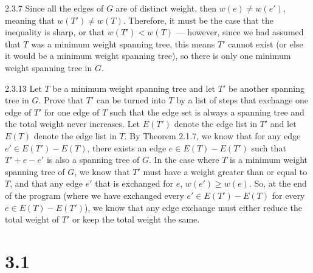 \documentclass[8pt]{extarticle}
\begin{document}
{\begin{problem}{2.3.7}
    Since all the edges of $G$ are of distinct weight, then $w(e) \neq w(e')$, meaning that $w(T') \neq w(T)$. Therefore, it must be the case that the inequality is sharp, or that $w(T') < w(T)$ --- however, since we had assumed that $T$ was a minimum weight spanning tree, this means $T'$ cannot exist (or else it would be a minimum weight spanning tree), so there is only one minimum weight spanning tree in $G$.
  \end{problem}
  \begin{problem}{2.3.13}
    Let $T$ be a minimum weight spanning tree and let $T'$ be another spanning tree in $G$. Prove that $T'$ can be turned into $T$ by a list of steps that exchange one edge of $T'$ for one edge of $T$ such that the edge set is always a spanning tree and the total weight never increases.
    \tcblower
    Let $E(T')$ denote the edge list in $T'$ and let $E(T)$ denote the edge list in $T$. By Theorem 2.1.7, we know that for any edge $e'\in E(T') - E(T)$, there exists an edge $e\in E(T) - E(T')$ such that $T'+ e - e'$ is also a spanning tree of $G$. In the case where $T$ is a minimum weight spanning tree of $G$, we know that $T'$ must have a weight greater than or equal to $T$, and that any edge $e'$ that is exchanged for $e$, $w(e') \geq w(e)$. So, at the end of the program (where we have exchanged every $e'\in E(T') - E(T)$ for every $e\in E(T) - E(T')$), we know that any edge exchange must either reduce the total weight of $T'$ or keep the total weight the same.
  \end{problem}
\section*{3.1}%

}
\end{document}
